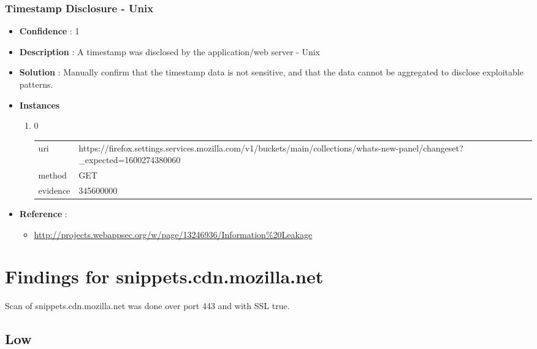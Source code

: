 \documentclass[10pt]{article}
\begin{document}
\subsubsection{Timestamp Disclosure - Unix}
\begin{itemize}
\item[] \textbf{Confidence} : 1
\item[] \textbf{Description} : A timestamp was disclosed by the application/web server - Unix
\item[] \textbf{Solution} :  Manually confirm that the timestamp data is not sensitive, and that the data cannot be aggregated to disclose exploitable patterns.
\item[] \textbf{Instances}
\begin{enumerate}
\item[] 0
\begin{tabular}{| l | p{14cm}}
uri & https://firefox.settings.services.mozilla.com/v1/buckets/main/collections/whats-new-panel/changeset?{\_}expected=1600274380060 \\
method & GET \\
evidence & 345600000 \\
\end{tabular}
\end{enumerate}
\item[] \textbf{Reference} : 
\begin{itemize}
\item \url{http://projects.webappsec.org/w/page/13246936/Information\%20Leakage}
\end{itemize}
\end{itemize}
\section{Findings for snippets.cdn.mozilla.net}
Scan of snippets.cdn.mozilla.net was done over port 443 and with SSL true.
\subsection{Low}
\end{document}
